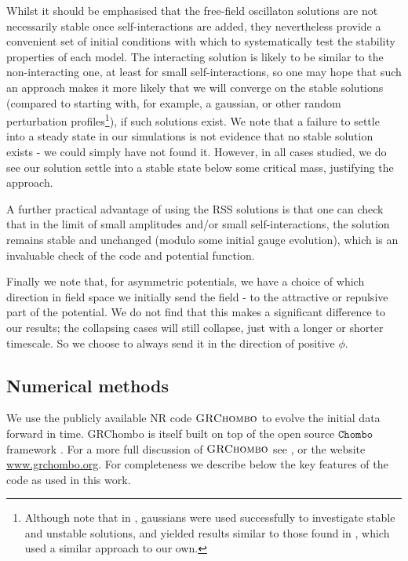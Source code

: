 \documentclass[11pt,a4paper]{article}
\begin{document}
Whilst it should be emphasised that the free-field oscillaton solutions are not necessarily stable once self-interactions are added, they nevertheless provide a convenient set of initial conditions with which to systematically test the stability properties of each model. The interacting solution is likely to be similar to the non-interacting one, at least for small self-interactions, so one may hope that such an approach makes it more likely that we will converge on the stable solutions (compared to starting with, for example, a gaussian, or other random perturbation profiles\footnote{Although note that in \cite{Michel:2018nzt}, gaussians were used successfully to investigate stable and unstable solutions, and yielded results similar to those found in \cite{Helfer:2016ljl}, which used a similar approach to our own.}), if such solutions exist. We note that a failure to settle into a steady state in our simulations is not evidence that no stable solution exists - we could simply have not found it. However, in all cases studied, we do see our solution settle into a stable state below some critical mass, justifying the approach.

A further practical advantage of using the RSS solutions is that one can check that in the limit of small amplitudes and/or small self-interactions, the solution remains stable and unchanged (modulo some initial gauge evolution), which is an invaluable check of the code and potential function.

Finally we note that, for asymmetric potentials, we have a choice of which direction in field space we initially send the field - to the attractive or repulsive part of the potential. We do not find that this makes a significant difference to our results; the collapsing cases will still collapse, just with a longer or shorter timescale. So we choose to always send it in the direction of positive $\phi$.

\subsection{Numerical methods}

We use the publicly available NR code $\textsc{GRChombo}$ to evolve the initial data forward in time. GRChombo is itself built on top of the open source $\mathtt{Chombo}$ framework \cite{Chombo}. For a more full discussion of $\textsc{GRChombo}$ see \cite{Clough:2015sqa}, or the website \url{www.grchombo.org}. For completeness we describe below the key features of the code as used in this work.
\end{document}
